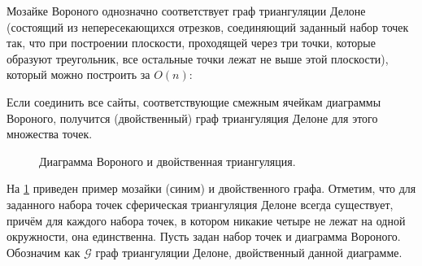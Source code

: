 Мозайке Вороного однозначно соответствует граф триангуляции Делоне (состоящий из непересекающихся отрезков, соединяющий заданный набор точек так, что при построении плоскости, проходящей через три точки, которые образуют треугольник, все остальные точки лежат не выше этой плоскости), который можно построить за $O(n)$:

\begin{theorem1}
Если соединить все сайты, соответствующие смежным ячейкам диаграммы Вороного, получится (двойственный) граф триангуляция Делоне для этого множества точек.
\end{theorem1}

\begin{figure}[h]
\centering
\captionsetup{justification=centering}
\caption{Диаграмма Вороного и двойственная триангуляция.}
\label{chapter1:fig:triangexample}
\end{figure}

На \figurename{ \ref{chapter1:fig:triangexample}} приведен пример мозайки (синим) и двойственного графа.
Отметим, что для заданного набора точек сферическая триангуляция Делоне всегда существует, причём для каждого набора точек, в котором никакие четыре не лежат на одной окружности, она единственна.
Пусть задан набор точек и диаграмма Вороного. Обозначим как $\mathcal{G}$ граф триангуляции Делоне, двойственный данной диаграмме. 

